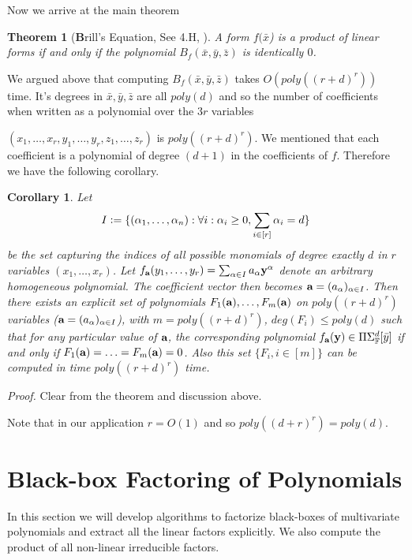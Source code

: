 \documentclass[12pt]{caltech_thesis}
\theoremstyle{plain}
\newtheorem{theorem}{Theorem}
\newtheorem{corollary}{Corollary}
\theoremstyle{definition}
\newcommand{\defeq}{\vcentcolon=}
\renewcommand{\bf}{\textbf}
\newcommand{\F}{\mathbb{F}}
\newcommand{\B}[1]{\bar{#1}}
\begin{document}
Now we arrive at the main theorem
\begin{theorem}[{\bf Brill's Equation}, See 4.H, \cite{GKZ94}]
 A form $f(\B{x}$) is a product of linear forms if and only if the polynomial $B_f(\B{x},\B{y},\B{z})$ is identically $0$.
\end{theorem}

We argued above that computing $B_f(\B{x},\B{y},\B{z})$ takes $O(poly((r+d)^r))$ time. It's degrees
in $\B{x},\B{y},\B{z}$ are all $poly(d)$ and so the number of coefficients when written as a polynomial over the $3r$ variables

$(x_1,\ldots,x_r,y_1,\ldots,y_r,z_1,\ldots,z_r)$ is $poly((r+d)^r)$. We mentioned that each coefficient is a polynomial
of degree $(d+1)$ in the coefficients of $f$. Therefore we have the following corollary.

\begin{corollary}\label{corollary:brills}
 Let
\[
 I\defeq \{(\alpha_1,\ldots,\alpha_n) : \forall i : \alpha_i\geq 0,
 \sum\limits_{i\in[r]}\alpha_i=d\}
 \]
be the set capturing the indices of all possible monomials of degree exactly $d$
in $r$ variables $(x_1,\ldots,x_r)$. Let
$f_{\bf a}(y_1,\ldots,y_r) = \sum_{\alpha\in I}a_{\alpha}{\bf y}^{\alpha}$
denote an arbitrary homogeneous polynomial. The coefficient vector then
becomes ${\bf a }= (a_\alpha)_{\alpha\in I}$.
Then there exists an explicit set of polynomials $F_1({\bf a}),\ldots,F_m({\bf
a})$ on $poly((r+d)^r)$ variables (${\bf a} = (a_\alpha)_{\alpha\in I}$), with $m=poly((r+d)^r)$,  $deg(F_i)\leq poly(d)$ such that for any
particular value of ${\bf a}$, the corresponding polynomial $f_{\bf a}({\bf
y})\in \Pi\Sigma_\F^{d}[\B{y}]$  if and only if $F_1({\bf a})=\ldots=F_m({\bf
a})=0$. Also this set $\{F_i, i\in [m]\}$ can be computed in time $poly((r+d)^r)$ time.
\end{corollary}
\emph{Proof.}
 Clear from the theorem and discussion above.


Note that in our application $r=O(1)$ and so $poly((d+r)^r) = poly(d)$.


\chapter{Black-box Factoring of Polynomials}\label{appendix:blackboxfactors}

In this section we will develop algorithms to factorize black-boxes of multivariate polynomials and extract all 
the linear factors explicitly. We also compute the product of all non-linear irreducible factors.
\end{document}
